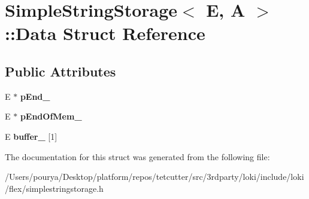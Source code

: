 \hypertarget{structSimpleStringStorage_1_1Data}{}\section{Simple\+String\+Storage$<$ E, A $>$\+:\+:Data Struct Reference}
\label{structSimpleStringStorage_1_1Data}
\subsection*{Public Attributes}
\begin{DoxyCompactItemize}
\item 
\hypertarget{structSimpleStringStorage_1_1Data_adef742d33dcf37f8b7cdfc89a5ca4cea}{}E $\ast$ {\bfseries p\+End\+\_\+}\label{structSimpleStringStorage_1_1Data_adef742d33dcf37f8b7cdfc89a5ca4cea}

\item 
\hypertarget{structSimpleStringStorage_1_1Data_a1023636bfe8761971e5bbc008c784ebf}{}E $\ast$ {\bfseries p\+End\+Of\+Mem\+\_\+}\label{structSimpleStringStorage_1_1Data_a1023636bfe8761971e5bbc008c784ebf}

\item 
\hypertarget{structSimpleStringStorage_1_1Data_a6a7a8a1e22beaa20ce067c18afa2248f}{}E {\bfseries buffer\+\_\+} \mbox{[}1\mbox{]}\label{structSimpleStringStorage_1_1Data_a6a7a8a1e22beaa20ce067c18afa2248f}

\end{DoxyCompactItemize}


The documentation for this struct was generated from the following file\+:\begin{DoxyCompactItemize}
\item 
/\+Users/pourya/\+Desktop/platform/repos/tetcutter/src/3rdparty/loki/include/loki/flex/simplestringstorage.\+h\end{DoxyCompactItemize}
